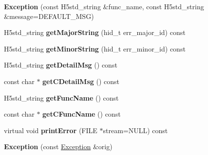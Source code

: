 \begin{DoxyCompactItemize}
\item 
\mbox{\label{class_h5_1_1_exception_a0f4ddd03c9177ca8c318f17e588cd713}} 
{\bfseries Exception} (const H5std\+\_\+string \&func\+\_\+name, const H5std\+\_\+string \&message=D\+E\+F\+A\+U\+L\+T\+\_\+\+M\+SG)
\item 
\mbox{\label{class_h5_1_1_exception_a232ec557c7bfba918b21d65802e27fa1}} 
H5std\+\_\+string {\bfseries get\+Major\+String} (hid\+\_\+t err\+\_\+major\+\_\+id) const
\item 
\mbox{\label{class_h5_1_1_exception_a6c7eef2706697be3b8c113cddd338f8b}} 
H5std\+\_\+string {\bfseries get\+Minor\+String} (hid\+\_\+t err\+\_\+minor\+\_\+id) const
\item 
\mbox{\label{class_h5_1_1_exception_a0d66dbcbc91c6ae539ad0ec5d2839c16}} 
H5std\+\_\+string {\bfseries get\+Detail\+Msg} () const
\item 
\mbox{\label{class_h5_1_1_exception_a198a6b260de0cdcab9e2044720214391}} 
const char $\ast$ {\bfseries get\+C\+Detail\+Msg} () const
\item 
\mbox{\label{class_h5_1_1_exception_ad557951533dc13f1e59171ccaf2e1f16}} 
H5std\+\_\+string {\bfseries get\+Func\+Name} () const
\item 
\mbox{\label{class_h5_1_1_exception_a09ff40e025d5a10472d26b0b1affd3d5}} 
const char $\ast$ {\bfseries get\+C\+Func\+Name} () const
\item 
\mbox{\label{class_h5_1_1_exception_a04328331cf6cfc4272181220b21c090f}} 
virtual void {\bfseries print\+Error} (F\+I\+LE $\ast$stream=N\+U\+LL) const
\item 
\mbox{\label{class_h5_1_1_exception_abc3b9e76dbfbdc6fc7939c67d3cfe72b}} 
{\bfseries Exception} (const \hyperlink{class_h5_1_1_exception}{Exception} \&orig)
\end{DoxyCompactItemize}

